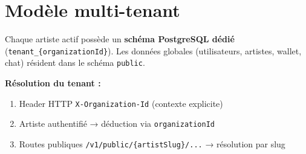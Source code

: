 \section{Modèle multi-tenant}

Chaque artiste actif possède un \textbf{schéma PostgreSQL dédié} (\texttt{tenant\_\{organizationId\}}).
Les données globales (utilisateurs, artistes, wallet, chat) résident dans le schéma \texttt{public}.


\textbf{Résolution du tenant :}
\begin{enumerate}[noitemsep]
  \item Header HTTP \texttt{X-Organization-Id} (contexte explicite)
  \item Artiste authentifié → déduction via \texttt{organizationId}
  \item Routes publiques \texttt{/v1/public/\{artistSlug\}/...} → résolution par slug
\end{enumerate}

